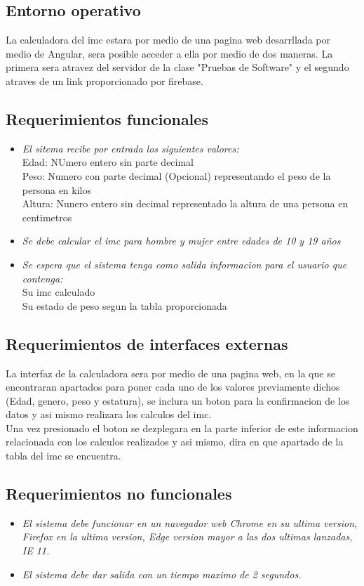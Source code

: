 \documentclass[12pt,a4paper]{article}
\begin{document}
\subsection{Entorno operativo}
	La calculadora del imc estara por medio de una pagina web desarrllada por medio de Angular, sera posible acceder a ella por medio de dos maneras. La primera sera atravez del servidor de la clase "Pruebas de Software" y el segundo atraves de un link proporcionado por firebase.\\

\subsection{Requerimientos funcionales}
\begin{itemize}
	\item\textit{El sitema recibe por entrada los siguientes valores:}\\
			Edad: NUmero entero sin parte decimal\\
			Peso: Numero con parte decimal (Opcional) representando el peso de la persona en kilos\\
			Altura: Nunero entero sin decimal representado la altura de una persona en centimetros\\
	\item\textit{Se debe calcular el imc para hombre y mujer entre edades de 10 y 19 años}\\
	\item\textit{Se espera que el sistema tenga como salida informacion para el usuario que contenga:}\\
			Su imc calculado\\
			Su estado de peso segun la tabla proporcionada\\
\end{itemize}

\subsection{Requerimientos de interfaces externas}
	La interfaz de la calculadora sera por medio de una pagina web, en la que se encontraran apartados para poner cada uno de los valores previamente dichos (Edad, genero, peso y estatura), se inclura un boton para la confirmacion de los datos y asi mismo realizara los calculos del imc.\\
	Una vez presionado el boton se dezplegara en la parte inferior de este informacion relacionada con los calculos realizados y asi mismo, dira en que apartado de la tabla del imc se encuentra.\\
	
\subsection{Requerimientos no funcionales}
\begin{itemize}
	\item\textit{El sistema debe funcionar en un navegador web Chrome en su ultima version, Firefox en la 			ultima version, Edge version mayor a las dos ultimas lanzadas, IE 11.}
	\item\textit{El sistema debe dar salida con un tiempo maximo de 2 segundos.}
\end{itemize}
\end{document}
